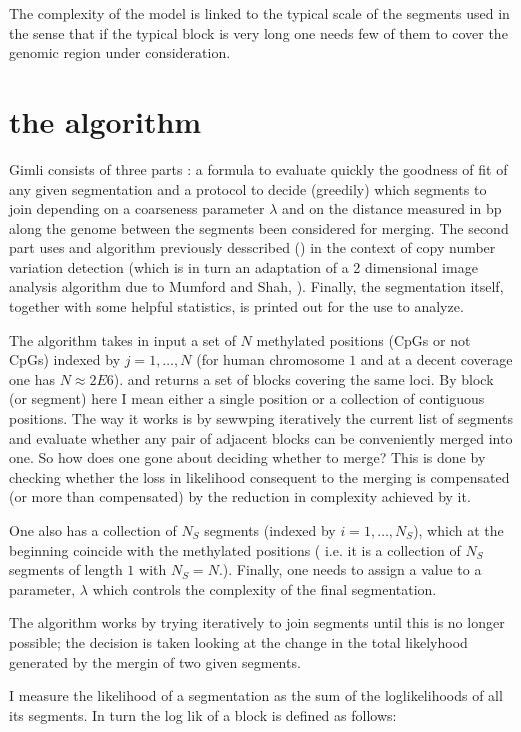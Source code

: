 \documentclass[11pt]{amsart}
\begin{document}
The complexity of the model is linked to the typical scale of the segments used
in the sense that if the typical block is very long one needs few of them to 
cover the genomic region under consideration.

\section{the algorithm}

Gimli consists of three parts : a formula to evaluate quickly the 
goodness of fit of any given segmentation
and a protocol to decide (greedily) which  segments to join depending 
on a coarseness parameter $\lambda$ and on the distance measured in bp along
the genome between the segments been considered for merging. 
The second part uses and  algorithm previously desscribed   (\cite{vega}) in 
the context of copy number variation detection (which is in turn an adaptation 
of a 2 dimensional image analysis algorithm due to Mumford and Shah, 
\cite{mumfordshah}). Finally, the segmentation itself, together with some 
helpful statistics, is printed out for the use to analyze.

The algorithm takes in input a set of $N$ methylated positions 
(CpGs or not CpGs) indexed by $j=1,\dots,N$ 
(for human chromosome $1$ and at a 
decent coverage one has $N \approx 2E6$).
and returns a set of blocks covering the same loci.
By block (or segment) here I mean either a single position or a collection
of contiguous positions. The way it works is by sewwping
iteratively the current list of segments and evaluate whether any pair 
of adjacent blocks can be conveniently merged into one. So how does one gone about
deciding whether to merge? This is  done by checking whether the loss in 
likelihood consequent to the merging is compensated (or more than compensated)
by the reduction in complexity achieved by it.

One also has a collection of $N_S$ 
segments (indexed by $i=1,\dots,N_S$), 
which at the beginning
coincide with the methylated positions ( i.e. it is a collection of $N_S$ 
segments of length $1$ with $N_S=N$.).
Finally, one needs to assign a value to a parameter, $\lambda$ which controls the 
complexity of the final segmentation.

The algorithm works by trying iteratively to join segments until this
is no longer possible; the decision is taken looking at the change
in the total likelyhood generated by the mergin of two given segments. 

I measure the likelihood of a segmentation as the sum of the loglikelihoods
of all its segments. In turn the log lik of a block is defined as follows:
\end{document}
